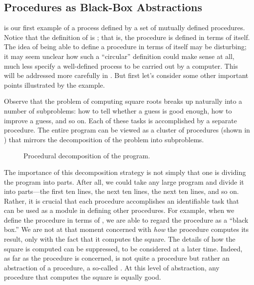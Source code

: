 \subsection{Procedures as Black-Box Abstractions}
\label{Section 1.1.8}

 is our first example of a process defined by a set of mutually defined procedures.
Notice that the definition of  is ;
that is, the procedure is defined in terms of itself.
The idea of being able to define a procedure in terms of itself may be disturbing;
it may seem unclear how such a “circular” definition could make sense at all, much less specify a well-defined process to be carried out by a computer.
This will be addressed more carefully in .
But first let’s consider some other important points illustrated by the  example.

Observe that the problem of computing square roots breaks up naturally into a number of subproblems:
how to tell whether a guess is good enough, how to improve a guess, and so on.
Each of these tasks is accomplished by a separate procedure.
The entire  program can be viewed as a cluster of procedures (shown in ) that mirrors the decomposition of the problem into subproblems.

\begin{figure}[tb]
	\centering
	
	\caption{
		Procedural decomposition of the  program.
	}
	\label{Figure 1.2}
\end{figure}

The importance of this decomposition strategy is not simply that one is dividing the program into parts.
After all, we could take any large program and divide it into parts---the first ten lines, the next ten lines, the next ten lines, and so on.
Rather, it is crucial that each procedure accomplishes an identifiable task that can be used as a module in defining other procedures.
For example, when we define the  procedure in terms of , we are able to regard the  procedure as a “black box.”
We are not at that moment concerned with \emph{how} the procedure computes its result, only with the fact that it computes the square.
The details of how the square is computed can be suppressed, to be considered at a later time.
Indeed, as far as the  procedure is concerned,  is not quite a procedure but rather an abstraction of a procedure, a so-called .
At this level of abstraction, any procedure that computes the square is equally good.

